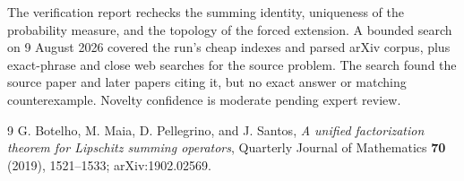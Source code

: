 \documentclass[10pt]{article}
\begin{document}
The verification report rechecks the summing identity, uniqueness of the
probability measure, and the topology of the forced extension. A bounded
search on 9 August 2026 covered the run's cheap indexes and parsed arXiv
corpus, plus exact-phrase and close web searches for the source problem. The
search found the source paper and later papers citing it, but no exact answer
or matching counterexample. Novelty confidence is moderate pending expert
review.

\begin{thebibliography}{9}
G. Botelho, M. Maia, D. Pellegrino, and J. Santos,
\emph{A unified factorization theorem for Lipschitz summing operators},
Quarterly Journal of Mathematics \textbf{70} (2019), 1521--1533;
arXiv:1902.02569.
\end{thebibliography}
\end{document}
